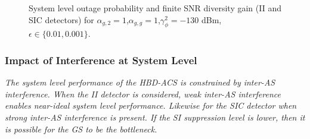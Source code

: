 \begin{figure}[]
\centering
{}
\hfil
{}
\caption{System level outage probability and finite SNR diversity gain (II and SIC detectors) for $\alpha_{g,2}=1$,$\alpha_{g,g}=1$,$\gamma_{\phi}^2=-130$ dBm, $\epsilon\in\{0.01, 0.001\}$.}
\label{interference_management_HBD_ACS_fig_sim}
\end{figure}

\subsubsection{Impact of Interference at System Level}

\begin{observation}
\emph{\emph{The system level performance of the HBD-ACS is constrained by inter-AS interference. When the II detector is considered, weak inter-AS interference enables near-ideal system level performance. Likewise for the SIC detector when strong inter-AS interference is present. If the SI suppression level is lower, then it is possible for the GS to be the bottleneck.}
}\end{observation}

